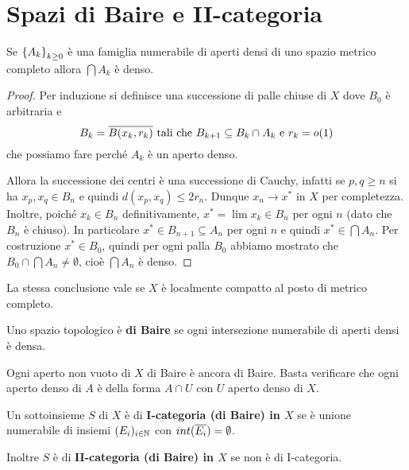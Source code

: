 \section{Spazi di Baire e II-categoria}
\begin{theorem}[Baire]\label{ThBaire}
Se $\left\{{A_k}\right\}_{k\geq 0}$ \`e una famiglia numerabile di aperti densi di uno spazio metrico completo allora $\bigcap A_k$ \`e denso.
\end{theorem}
\begin{proof}
Per induzione si definisce una successione di palle chiuse di $X$ dove $B_0$ \`e arbitraria e
\[B_k=\overline{B(x_k,r_k)}\text{ tali che }B_{k+1}\subseteq B_k\cap A_k\text{ e }r_k=o(1)\]
che possiamo fare perch\'e $A_k$ \`e un aperto denso.

Allora la successione dei centri \`e una successione di Cauchy, infatti se $p,q\geq n$ si ha $x_p,x_q\in B_n$ e quindi $d(x_p,x_q)\leq 2r_n$. Dunque $x_n\to x^\ast$ in $X$ per completezza. Inoltre, poich\'e $x_k\in B_n$ definitivamente, $x^\ast=\lim x_k\in B_n$ per ogni $n$ (dato che $B_n$ \`e chiuso). In particolare $x^\ast\in B_{n+1}\subseteq A_n$ per ogni $n$ e quindi $x^\ast\in \bigcap A_n$. Per costruzione $x^\ast\in B_0$, quindi per ogni palla $B_0$ abbiamo mostrato che $B_0\cap \bigcap A_n\neq \emptyset$, cio\`e $\bigcap A_n$ \`e denso.
\end{proof}

\begin{exercise}
La stessa conclusione vale se $X$ \`e localmente compatto al posto di metrico completo.
\end{exercise}

\begin{definition}
Uno spazio topologico \`e \textbf{di Baire} se ogni intersezione numerabile di aperti densi \`e densa.
\end{definition}

\begin{remark}
Ogni aperto non vuoto di $X$ di Baire \`e ancora di Baire. Basta verificare che ogni aperto denso di $A$ \`e della forma $A\cap U$ con $U$ aperto denso di $X$.
\end{remark}


\begin{definition}
Un sottoinsieme $S$ di $X$ \`e di \textbf{I-categoria (di Baire) in $X$} se \`e unione numerabile di insiemi $(E_i)_{i\in\mathbb{N}}$ con $int(\overline{E_i})=\emptyset$.

Inoltre $S$ \`e di \textbf{II-categoria (di Baire) in $X$} se non \`e di I-categoria.
\end{definition}

